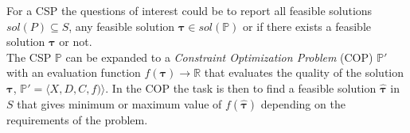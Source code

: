 For a CSP the questions of interest could be to report all feasible solutions $sol(P) \subseteq S $, any feasible 
solution $\mathbf{\tau}\in sol(\mathbb{P})$ or if there exists a feasible solution $\mathbf{\tau}$ or not. \\
The CSP $\mathbb{P}$ can be expanded to a \emph{Constraint Optimization Problem} (COP) $\mathbb{P'}$ 
with an evaluation function $f(\mathbf{\tau}) \rightarrow \mathbb{R}$ that evaluates the quality of the solution 
$\mathbf{\tau}$, $\mathbb{P'} = \langle X,D,C,f) \rangle$.  In the COP the task is then to find a feasible solution 
$\hat{\mathbf{\tau}}$ in $S$ that gives minimum or maximum value of $f(\hat{\mathbf{\tau}})$ depending on the 
requirements of the problem. \\ 
  